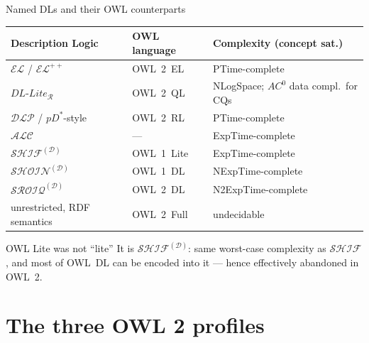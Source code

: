 \documentclass[10pt,aspectratio=169,xcolor=table]{beamer}
\newcommand{\dl}[1]{\ensuremath{\mathcal{#1}}}
\newcommand{\ALC}{\dl{ALC}}
\newcommand{\EL}{\dl{EL}}
\newcommand{\SROIQ}{\dl{SROIQ}}
\newcommand{\SHOIN}{\dl{SHOIN}}
\newcommand{\SHIF}{\dl{SHIF}}
\newcommand{\dllite}[1]{\ensuremath{\textit{DL-Lite}_{#1}}}
\begin{document}
\begin{frame}{Named DLs and their OWL counterparts}
  \centering
  \begin{tabular}{@{}lll@{}}
    \toprule
    \textbf{Description Logic} & \textbf{OWL language} & \textbf{Complexity (concept sat.)}\\
    \midrule
    $\EL$ / $\EL^{++}$          & OWL~2~EL    & PTime-complete\\
    $\dllite{\mathcal{R}}$      & OWL~2~QL    & NLogSpace; $AC^0$ data compl.\ for CQs\\
    \dl{DLP} / $pD^*$-style     & OWL~2~RL    & PTime-complete\\
    $\ALC$                      & ---         & ExpTime-complete\\
    $\SHIF^{(\mathcal{D})}$     & OWL~1~Lite  & ExpTime-complete\\
    $\SHOIN^{(\mathcal{D})}$    & OWL~1~DL    & NExpTime-complete\\
    $\SROIQ^{(\mathcal{D})}$    & OWL~2~DL    & N2ExpTime-complete\\
    unrestricted, RDF semantics & OWL~2~Full  & undecidable\\
    \bottomrule
  \end{tabular}
  \vspace{1em}
  \begin{alertblock}{OWL Lite was not ``lite''}
    It is $\SHIF^{(\mathcal{D})}$: same worst-case complexity as $\SHIF$, and most of OWL~DL
    can be encoded into it --- hence effectively abandoned in OWL~2.
  \end{alertblock}
\end{frame}

\section{The three OWL 2 profiles}
\end{document}
